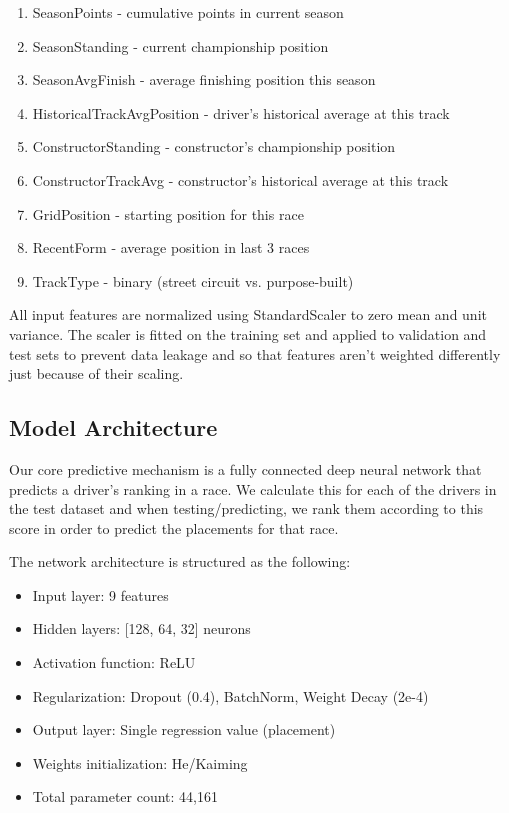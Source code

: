 \documentclass{article}
\begin{document}
\begin{enumerate}
    \item SeasonPoints - cumulative points in current season
    \item SeasonStanding - current championship position
    \item SeasonAvgFinish - average finishing position this season
    \item HistoricalTrackAvgPosition - driver's historical average at this track
    \item ConstructorStanding - constructor's championship position
    \item ConstructorTrackAvg - constructor's historical average at this track
    \item GridPosition - starting position for this race
    \item RecentForm - average position in last 3 races
    \item TrackType - binary (street circuit vs. purpose-built)
\end{enumerate}

All input features are normalized using StandardScaler to zero mean and unit variance. The scaler is fitted on the training set and applied to validation and test sets to prevent data leakage and so that features aren't weighted differently just because of their scaling.

\subsection{Model Architecture}

Our core predictive mechanism is a fully connected deep neural network that predicts a driver's ranking in a race. We calculate this for each of the drivers in the test dataset and when testing/predicting, we rank them according to this score in order to predict the placements for that race.

The network architecture is structured as the following:

\begin{itemize}
    \item Input layer: 9 features
    \item Hidden layers: [128, 64, 32] neurons
    \item Activation function: ReLU
    \item Regularization: Dropout (0.4), BatchNorm, Weight Decay (2e-4)
    \item Output layer: Single regression value (placement)
    \item Weights initialization: He/Kaiming
    \item Total parameter count: 44,161
\end{itemize}
\end{document}
